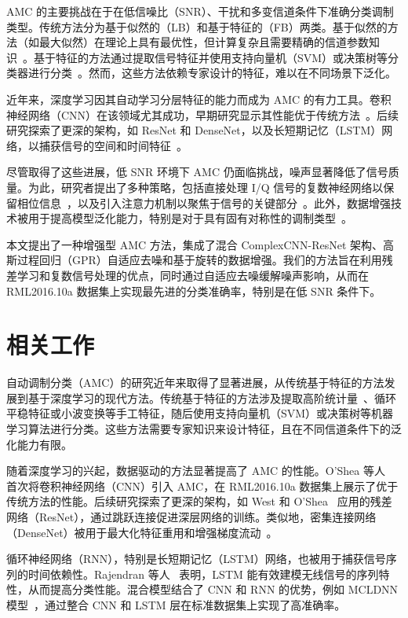 \documentclass[conference]{IEEEtran}
\begin{document}
AMC 的主要挑战在于在低信噪比（SNR）、干扰和多变信道条件下准确分类调制类型。传统方法分为基于似然的（LB）和基于特征的（FB）两类。基于似然的方法（如最大似然）在理论上具有最优性，但计算复杂且需要精确的信道参数知识~\cite{hameed2009likelihood}。基于特征的方法通过提取信号特征并使用支持向量机（SVM）或决策树等分类器进行分类~\cite{hazza2013overview}。然而，这些方法依赖专家设计的特征，难以在不同场景下泛化。

近年来，深度学习因其自动学习分层特征的能力而成为 AMC 的有力工具。卷积神经网络（CNN）在该领域尤其成功，早期研究显示其性能优于传统方法~\cite{oshea2016convolutional}。后续研究探索了更深的架构，如 ResNet 和 DenseNet，以及长短期记忆（LSTM）网络，以捕获信号的空间和时间特征~\cite{west2017deep,rajendran2018deep}。

尽管取得了这些进展，低 SNR 环境下 AMC 仍面临挑战，噪声显著降低了信号质量。为此，研究者提出了多种策略，包括直接处理 I/Q 信号的复数神经网络以保留相位信息~\cite{li2023lightweight}，以及引入注意力机制以聚焦于信号的关键部分~\cite{kim2020efficient}。此外，数据增强技术被用于提高模型泛化能力，特别是对于具有固有对称性的调制类型~\cite{zhang2023efficient}。

本文提出了一种增强型 AMC 方法，集成了混合 ComplexCNN-ResNet 架构、高斯过程回归（GPR）自适应去噪和基于旋转的数据增强。我们的方法旨在利用残差学习和复数信号处理的优点，同时通过自适应去噪缓解噪声影响，从而在 RML2016.10a 数据集上实现最先进的分类准确率，特别是在低 SNR 条件下。



\section{相关工作}
自动调制分类（AMC）的研究近年来取得了显著进展，从传统基于特征的方法发展到基于深度学习的现代方法。传统基于特征的方法涉及提取高阶统计量~\cite{hazza2013overview}、循环平稳特征或小波变换等手工特征，随后使用支持向量机（SVM）或决策树等机器学习算法进行分类。这些方法需要专家知识来设计特征，且在不同信道条件下的泛化能力有限。

随着深度学习的兴起，数据驱动的方法显著提高了 AMC 的性能。O'Shea 等人~\cite{oshea2016convolutional} 首次将卷积神经网络（CNN）引入 AMC，在 RML2016.10a 数据集上展示了优于传统方法的性能。后续研究探索了更深的架构，如 West 和 O'Shea~\cite{west2017deep} 应用的残差网络（ResNet），通过跳跃连接促进深层网络的训练。类似地，密集连接网络（DenseNet）被用于最大化特征重用和增强梯度流动~\cite{patil2021automatic}。

循环神经网络（RNN），特别是长短期记忆（LSTM）网络，也被用于捕获信号序列的时间依赖性。Rajendran 等人~\cite{rajendran2018deep} 表明，LSTM 能有效建模无线信号的序列特性，从而提高分类性能。混合模型结合了 CNN 和 RNN 的优势，例如 MCLDNN 模型~\cite{xu2020spatiotemporal}，通过整合 CNN 和 LSTM 层在标准数据集上实现了高准确率。
\end{document}

